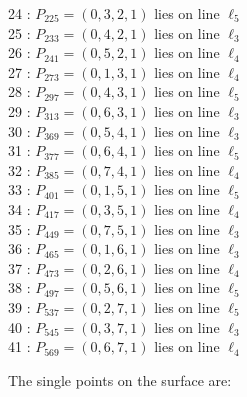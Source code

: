 \documentclass{article}
\begin{document}
{\begin{multicols}{2}
24 : $P_{225}=( 0, 3, 2, 1 )$ lies on line $\ell_{5}$\\
25 : $P_{233}=( 0, 4, 2, 1 )$ lies on line $\ell_{3}$\\
26 : $P_{241}=( 0, 5, 2, 1 )$ lies on line $\ell_{4}$\\
27 : $P_{273}=( 0, 1, 3, 1 )$ lies on line $\ell_{4}$\\
28 : $P_{297}=( 0, 4, 3, 1 )$ lies on line $\ell_{5}$\\
29 : $P_{313}=( 0, 6, 3, 1 )$ lies on line $\ell_{3}$\\
30 : $P_{369}=( 0, 5, 4, 1 )$ lies on line $\ell_{3}$\\
31 : $P_{377}=( 0, 6, 4, 1 )$ lies on line $\ell_{5}$\\
32 : $P_{385}=( 0, 7, 4, 1 )$ lies on line $\ell_{4}$\\
33 : $P_{401}=( 0, 1, 5, 1 )$ lies on line $\ell_{5}$\\
34 : $P_{417}=( 0, 3, 5, 1 )$ lies on line $\ell_{4}$\\
35 : $P_{449}=( 0, 7, 5, 1 )$ lies on line $\ell_{3}$\\
36 : $P_{465}=( 0, 1, 6, 1 )$ lies on line $\ell_{3}$\\
37 : $P_{473}=( 0, 2, 6, 1 )$ lies on line $\ell_{4}$\\
38 : $P_{497}=( 0, 5, 6, 1 )$ lies on line $\ell_{5}$\\
39 : $P_{537}=( 0, 2, 7, 1 )$ lies on line $\ell_{5}$\\
40 : $P_{545}=( 0, 3, 7, 1 )$ lies on line $\ell_{3}$\\
41 : $P_{569}=( 0, 6, 7, 1 )$ lies on line $\ell_{4}$\\
\end{multicols}
The single points on the surface are:\\
}
\end{document}
